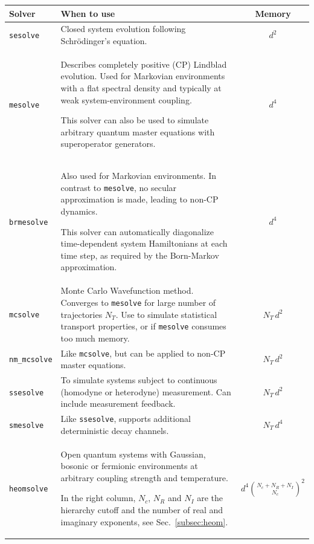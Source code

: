 \documentclass[preprint,3p,sort&compress]{elsarticle}
\def\code#1{\texttt{#1}}
\begin{document}
\begin{table}[t!]
    \centering
     \renewcommand{\arraystretch}{1.7} 
    \begin{tabular}{@{}lp{10cm}c@{}}
        \toprule
        \textbf{Solver} & \textbf{When to use} & \textbf{Memory} \\
        \midrule
        \code{sesolve} & Closed system evolution following Schrödinger's equation. &  $d^2$ \\
      
        \code{mesolve} & Describes completely positive (CP) Lindblad evolution. Used for Markovian environments with a flat spectral density and typically at weak system-environment coupling.\par This solver can also be used to simulate arbitrary quantum master equations with superoperator generators. & $d^4$ \\
    
        \code{brmesolve} & Also used for Markovian environments. In contrast to \code{mesolve}, no secular approximation is made, leading to non-CP dynamics.\par This solver can automatically diagonalize time-dependent system Hamiltonians at each time step, as required by the Born-Markov approximation. & $d^4$ \\

        \code{mcsolve} & Monte Carlo Wavefunction method. Converges to \code{mesolve} for large number of trajectories $N_T$. Use to simulate statistical transport properties, or if \code{mesolve} consumes too much memory. & $N_T\, d^2$ \\

        \code{nm\_mcsolve} & Like \code{mcsolve}, but can be applied to non-CP master equations. & $N_T\, d^2$ \\

        \code{ssesolve} & To simulate systems subject to continuous (homodyne or heterodyne) measurement. Can include measurement feedback. & $N_T\, d^2$ \\

        \code{smesolve} & Like \code{ssesolve}, supports additional deterministic decay channels. & $N_T\, d^4$ \\

        \code{heomsolve} & Open quantum systems with Gaussian, bosonic or fermionic environments at arbitrary coupling strength and temperature.\par In the right column, $N_c$, $N_R$ and $N_I$ are the hierarchy cutoff and the number of real and imaginary exponents, see Sec.~\ref{subsec:heom}. & $d^4 \binom{N_c + N_R + N_I}{N_c}^2$ \\


\end{tabular}
\end{table}
\end{document}

